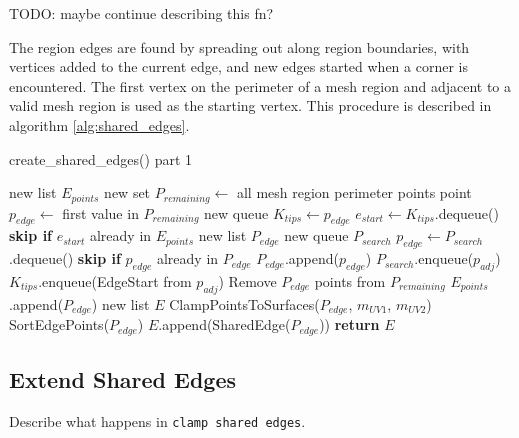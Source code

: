 TODO: maybe continue describing this fn?

The region edges are found by spreading out along region boundaries, with vertices added to the current edge, and new edges started when a corner is encountered.
The first vertex on the perimeter of a mesh region and adjacent to a valid mesh region is used as the starting vertex.
This procedure is described in algorithm \ref{alg:shared_edges}.

\begin{algorithm}
	\caption{create\_shared\_edges() part 1}\label{alg:shared_edges}
\begin{algorithmic}[1]
	\State new list $E_{points}$ 
	\State new set $P_{remaining} \leftarrow$ all mesh region perimeter points
		\State point $p_{edge} \leftarrow$ first value in $P_{remaining}$
		\State new queue $K_{tips} \leftarrow p_{edge}$ 
			\State $e_{start} \leftarrow K_{tips}$.dequeue()
			\State \textbf{skip if} $e_{start}$ already in $E_{points}$
			\State new list $P_{edge}$ 
			\State new queue $P_{search}$ 
				\State $p_{edge} \leftarrow P_{search}$.dequeue()
				\State \textbf{skip if} $p_{edge}$ already in $P_{edge}$
				\State $P_{edge}$.append($p_{edge}$)
						\State $P_{search}$.enqueue($p_{adj}$)
					\EndIf
						\State $K_{tips}$.enqueue(EdgeStart from $p_{adj}$)
					\EndIf
				\EndFor
			\EndWhile
			\State Remove $P_{edge}$ points from $P_{remaining}$
			\State $E_{points}$.append($P_{edge}$)
		\EndWhile
	\EndWhile
	\State new list $E$ 
		\State ClampPointsToSurfaces($P_{edge}$, $m_{UV1}$, $m_{UV2}$)
		\State SortEdgePoints($P_{edge}$)
		\State $E$.append(SharedEdge($P_{edge}$))
	\EndFor
	\State \textbf{return} $E$
\EndFunction
\end{algorithmic}
\end{algorithm}

\subsection{Extend Shared Edges}
Describe what happens in \verb|clamp shared edges|.

